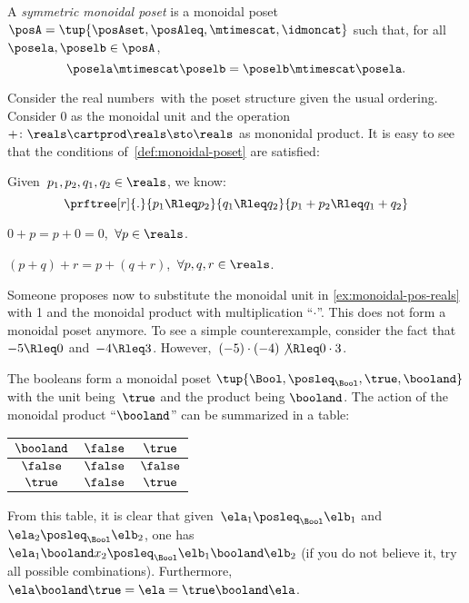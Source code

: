 \begin{ctdefinition}
    \label{def:sym-monoidal-poset}
    A \emph{symmetric monoidal poset} is a monoidal poset~$\posA=\tup{\posAset, \posAleq, \mtimescat, \idmoncat}$ such that, for all~$\posela, \poselb \in \posA$,
    \begin{equation}
        \posela \mtimescat \poselb = \poselb \mtimescat \posela.
    \end{equation}
\end{ctdefinition}

\begin{example}
    \label{ex:monoidal-pos-reals}
    Consider the real numbers~\reals with the poset structure given the usual ordering.
    Consider 0 as the monoidal unit and the operation~$+\colon \reals\cartprod \reals\sto \reals$ as mononidal product.
    It is easy to see that the conditions of~\cref{def:monoidal-poset} are satisfied:
    \begin{compactenum}[(a)]
        \item Given~$p_1,p_2,q_1,q_2\in \reals$, we know:
        \begin{equation*}
            \prftree[r]{.}{p_1\Rleq  p_2}{q_1\Rleq  q_2}{p_1+p_2\Rleq  q_1+q_2}
        \end{equation*}
        \item $0+p=p+0=0$,~$\forall p\in \reals$.
        \item $(p+q)+r=p+(q+r)$,~$\forall p,q,r\in \reals$.
    \end{compactenum}
\end{example}

\begin{example}
    Someone proposes now to substitute the monoidal unit in \cref{ex:monoidal-pos-reals} with 1 and the monoidal product with multiplication ``$\cdot$''.
    This does not form a monoidal poset anymore.
    To see a simple counterexample, consider the fact that~$-5\Rleq 0$ and~$-4\Rleq 3$.
    However,~$(-5)\cdot (-4) \not{\Rleq} 0 \cdot 3$.
\end{example}

\begin{example}
    The booleans form a monoidal poset $\tup{\Bool,\posleq_{\Bool},\true,\booland}$
    with the unit being~$\true$ and the product being $\booland$.
    The action of the monoidal product ``$\booland$'' can be summarized in a table:
    \begin{center}
        \begin{tabular}{c|cc}
            $\booland$ & $\false$ & $\true$  \\
            \hline
            $\false$   & $\false$ & $\false$ \\
            $\true$    & $\false$ & $\true$
        \end{tabular}
    \end{center}
    From this table, it is clear that given~$\ela_1\posleq_{\Bool}\elb_1$ and~$\ela_2\posleq_{\Bool} \elb_2$, one has~$\ela_1\booland x_2\posleq_{\Bool} \elb_1\booland \elb_2$ (if you do not believe it, try all possible combinations).
    Furthermore,~$\ela\booland \true=\ela=\true \booland \ela$.
\end{example}

